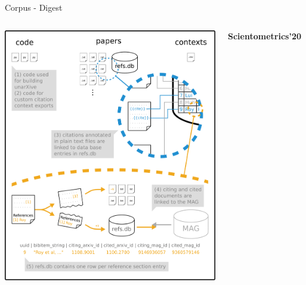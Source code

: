 \documentclass[en,16:9,smallfoot]{sdqbeamer}
\begin{document}
\begin{frame}{Corpus - Digest}
\begin{columns}
            \includegraphics[width=0.75\linewidth]{imgs/unarXive_2020_structure_with_db}
           \begin{infobox-pub-small}
           \textbf{Scientometrics'20}~\cite{Saier2020}
           \end{infobox-pub-small}
   \end{columns}
   \end{frame}
\end{document}
